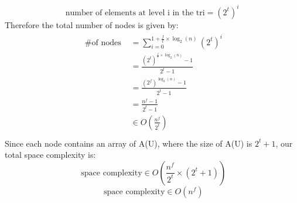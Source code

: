 \documentclass[12pt]{article}
\begin{document}
\begin{adjustwidth}{0em}{0pt}
\[ \text{number of elements at level i in the tri} = (2^t)^i\]
Therefore the total number of nodes is given by:
\begin{align*}
    \begin{aligned}
      \text{ \# of nodes } &= \sum_{i=0}^{1 + \frac{f}{t}\times\log_{2}(n)} (2^t)^i \\
       &= \frac{(2^t)^{\frac{f}{t}\times\log_{2}(n)} - 1}{2^t -1} \\
       &= \frac{(2^f)^{\log_{2}(n)} - 1}{2^t -1} \\
       &= \frac{n^f - 1}{2^t -1} \\
       &\in O(\frac{n^f}{2^t}) \\
    \end{aligned}
\end{align*}
Since each node contains an array of A(U), where the size of A(U) is $2^t+1$, our total space complexity is:
\[ \text{ space complexity} \in O(\frac{n^f}{2^t}\times(2^t+1)) \]
\[ \text{ space complexity} \in O(n^f) \]
\end{adjustwidth} 
\end{document}
